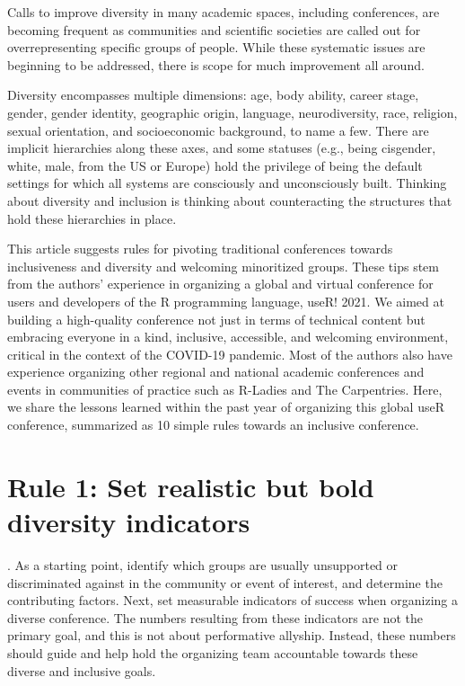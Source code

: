 \documentclass[10pt,letterpaper]{article}
\begin{document}
Calls to improve diversity in many academic spaces, including conferences, are becoming frequent as communities and scientific societies are called out for overrepresenting specific groups of people. While these systematic issues are beginning to be addressed, there is scope for much improvement all around.

Diversity encompasses multiple dimensions: age, body ability, career stage, gender, gender identity,  geographic origin, language, neurodiversity, race, religion, sexual orientation, and socioeconomic background, to name a few. There are implicit hierarchies along these axes, and some statuses (e.g., being cisgender, white, male, from the US or Europe) hold the privilege of being the default settings for which all systems are consciously and unconsciously built. Thinking about diversity and inclusion is thinking about counteracting the structures that hold these hierarchies in place.


This article suggests rules for pivoting traditional conferences towards inclusiveness and diversity and welcoming minoritized groups. These tips stem from the authors' experience in organizing a global and virtual conference for users and developers of the R programming language, useR! 2021. We aimed at building a high-quality conference not just in terms of technical content but embracing everyone in a kind, inclusive, accessible, and welcoming environment, critical in the context of the COVID-19 pandemic. Most of the authors also have experience organizing other regional and national academic conferences and events in communities of practice such as R-Ladies and The Carpentries. Here, we share the lessons learned within the past year of organizing this global useR conference, summarized as 10 simple rules towards an inclusive conference.

\section*{Rule 1: Set realistic but bold diversity indicators}
.
As a starting point, identify which groups are usually unsupported or discriminated against in the community or event of interest, and determine the contributing factors. Next, set measurable indicators of success when organizing a diverse conference. The numbers resulting from these indicators are not the primary goal, and this is not about performative allyship. Instead, these numbers should guide and help hold the organizing team accountable towards these diverse and inclusive goals.
\end{document}
